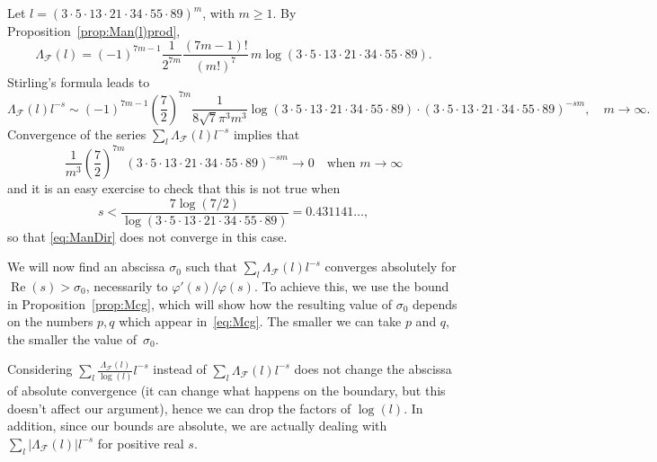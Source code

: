 \documentclass[11pt, a4paper]{article}
\renewcommand{\Re}{\operatorname{Re}}
\newcommand{\manF}{\Lambda_{\mathcal{F}}}
\theoremstyle{plain}
\theoremstyle{definition}
\begin{document}
Let $l = (3\cdot 5\cdot 13\cdot 21\cdot 34\cdot 55\cdot 89)^m$, with $m \ge 1$. By Proposition~\ref{prop:Man(l)prod},
\[
\manF(l) = (-1)^{7m-1} \frac{1}{2^{7m}} \frac{(7m-1)!}{(m!)^7}\, m 
\log(3\cdot 5\cdot 13\cdot 21\cdot 34\cdot 55\cdot 89).
\]
Stirling’s formula leads to
\[
\manF(l) l^{-s} \sim (-1)^{7m-1} \left(\frac{7}{2}\right)^{7m} \frac{1}{8\sqrt{7}\pi^3 m^3} 
\log(3\cdot 5\cdot 13\cdot 21\cdot 34\cdot 55\cdot 89) \cdot
(3\cdot 5\cdot 13\cdot 21\cdot 34\cdot 55\cdot 89)^{-sm},
\quad m \to \infty.
\]
Convergence of the series $\sum_{l} \manF(l) l^{-s}$ implies that
\[
\frac{1}{m^3} \left(\frac{7}{2}\right)^{7m} 
(3\cdot 5\cdot 13\cdot 21\cdot 34\cdot 55\cdot 89)^{-sm} \to 0 \quad \text{when }m \to \infty
\]
and it is an easy exercise to check that this is not true when
\[
s < \frac{7\log(7/2)}{\log(3\cdot 5\cdot 13\cdot 21\cdot 34\cdot 55\cdot 89)} = 0.431141\dots,
\]
so that \eqref{eq:ManDir} does not converge in this case.

We will now find an abscissa $\sigma_0$ such that $\sum_l {\manF(l)} l^{-s}$ converges absolutely for $\Re(s)>\sigma_0$, necessarily to $\varphi'(s)/\varphi(s)$. To achieve this, we use the bound in Proposition~\ref{prop:Mcg}, which will show how the resulting value of $\sigma_{0}$ depends on the numbers $p,q$ which appear in~\eqref{eq:Mcg}. The smaller we can take $p$ and $q$, the smaller the value of~$\sigma_0$. 

Considering $\sum_l \frac{\manF(l)}{\log(l)} l^{-s}$ instead of $\sum_l {\manF(l)} l^{-s}$ does not change the abscissa of absolute convergence (it can change what happens on the boundary, but this doesn't affect our argument), hence we can drop the factors of $\log(l)$. In addition, since our bounds are absolute, we are actually dealing with  $\sum_l {|\manF(l)|} l^{-s}$ for positive real $s$.
\end{document}
